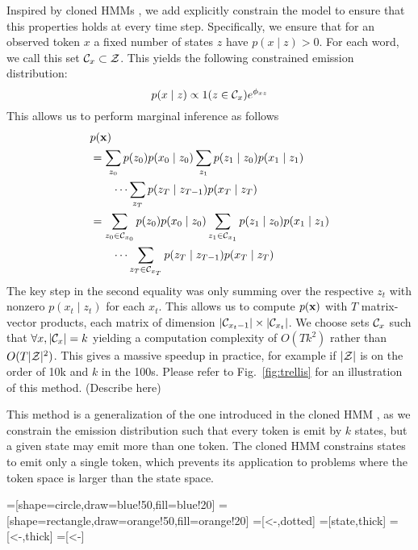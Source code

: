 \documentclass[11pt,a4paper]{article}
\begin{document}
Inspired by cloned HMMs \citep{dedieu2019learning},
we add explicitly constrain the model to ensure that this properties holds at every time step.
Specifically, we ensure that for an observed token $x$
a fixed number of states $z$ have $p(x \mid z) > 0$.
For each word, we call this set $\mathcal{C}_x \subset \mathcal{Z}$.
This yields the following constrained emission distribution:
\begin{equation}
\label{eqn:sparse_emission}
p(x \mid z) \propto 1(z \in \mathcal{C}_x)e^{\phi_{xz}}
\end{equation}
This allows us to perform marginal inference as follows
\begin{equation}
\label{eqn:sparse_marginalization}
\begin{aligned}
&p(\mathbf{x})\\
&= \sum_{z_0} p(z_0)p(x_0 \mid z_0)
    \sum_{z_1}p(z_1\mid z_0)p(x_1 \mid z_1)\\
    &\qquad\cdots
    \sum_{z_T}p(z_T \mid z_{T-1})p(x_T \mid z_T)\\
&= \sum_{z_0 \in \mathcal{C}_{x_0}} p(z_0)p(x_0 \mid z_0)
    \sum_{z_1 \in \mathcal{C}_{x_1}} p(z_1\mid z_0)p(x_1 \mid z_1)\\
    &\qquad\cdots
    \sum_{z_T \in \mathcal{C}_{x_T}} p(z_T \mid z_{T-1})p(x_T \mid z_T)
\end{aligned}
\end{equation}
The key step in the second equality was only summing
over the respective $z_t$ with nonzero $p(x_t \mid z_t)$ for each $x_t$.
This allows us to compute $p(\mathbf{x})$ with $T$ matrix-vector products,
each matrix of dimension $|\mathcal{C}_{x_t-1}| \times |\mathcal{C}_{x_{t}}|$.
We choose sets $\mathcal{C}_x$ such that $\forall x, |\mathcal{C}_x| = k$
yielding a computation complexity of $O(Tk^2)$ rather than $O(T|\mathcal{Z}|^2)$.
This gives a massive speedup in practice, for example if $|\mathcal{Z}|$ is on the order of
10k and $k$ in the 100s.
Please refer to Fig.~\ref{fig:trellis} for an illustration of this method.
(Describe here)

This method is a generalization of the one introduced in the cloned HMM \citep{dedieu2019learning},
as we constrain the emission distribution such that every token is emit by $k$
states, but a given state may emit more than one token.
The cloned HMM constrains states to emit only a single token,
which prevents its application to problems where the token space is larger than the state space.

=[shape=circle,draw=blue!50,fill=blue!20]
=[shape=rectangle,draw=orange!50,fill=orange!20]
=[<-,dotted]
=[state,thick]
=[<-,thick]
=[<-]
\end{document}

